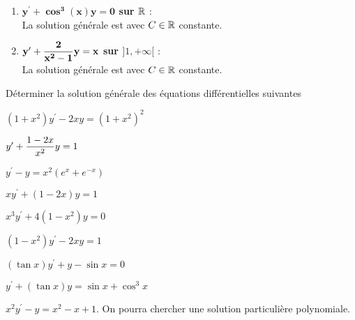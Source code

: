 \documentclass[a4paper, 11pt,reqno]{article}
\begin{document}
\begin{correction}
\begin{enumerate}
\item \textbf{$\mathbf{y^{\prime}+\cos^3{(x)} y=0}$ sur $\mathbb{R}$} :\\
La solution g\'en\'erale est   avec $C\in\mathbb{R}$ constante.
\item \textbf{$\mathbf{y^{\prime}+\displaystyle\frac{2}{x^2-1}y=x}$ sur $\rbrack 1,+\infty\lbrack$} :\\
La solution g\'en\'erale est   avec $C\in\mathbb{R}$ constante.
\end{enumerate}
\end{correction}


\begin{exercice}   \;
D\'eterminer la solution g\'en\'erale des \'equations diff\'erentielles suivantes
\begin{enumerate}
\begin{minipage}[c]{0.45\linewidth}
 \item $(1+x^2)y^{\prime}-2xy=(1+x^2)^2$
\item $y^{\prime}+ \displaystyle\frac{1-2x}{x^2} y=1$
\item $y^{\prime}-y=x^2(e^x+e^{-x})$
\item $xy^{\prime}+(1-2x)y=1$
\item $x^3y^{\prime}+4(1-x^2)y=0$
\end{minipage}
\begin{minipage}[c]{0.45\linewidth}
\item $(1-x^2)y^{\prime}-2xy=1$
\item $(\tan{x})y^{\prime}+y-\sin{x}=0$
\item $y^{\prime}+(\tan{x})y=\sin{x}+\cos^3{x}$
\item $x^2 y^{\prime}-y=x^2-x+1$. On pourra chercher une solution particuli\`ere polynomiale.
\end{minipage}
\end{enumerate}
\end{exercice}
\end{document}
